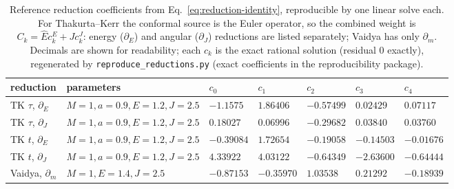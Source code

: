 \documentclass[
    aps, prd, twocolumn, superscriptaddress,
    showpacs, nofootinbib, floatfix
]{revtex4-2}
\newcommand{\Ehat}{\hat E}
\begin{document}
\begin{table}[t]
    \centering
    \caption{Reference reduction coefficients from
    Eq.~\eqref{eq:reduction-identity}, reproducible by one linear solve each. For
    Thakurta--Kerr the conformal source is the Euler operator, so the combined
    weight is $C_k=\Ehat c_k^{E}+J c_k^{J}$: energy ($\partial_E$) and angular
    ($\partial_J$) reductions are listed separately; Vaidya has only $\partial_m$.
    Decimals are shown for readability; each $c_k$ is the exact rational solution
    (residual $0$ exactly), regenerated by \texttt{reproduce\_reductions.py} (exact
    coefficients in the reproducibility package).}
    \label{tab:reduction-ck}
    \begin{ruledtabular}
    \begin{tabular}{lllllll}
        reduction & parameters & $c_0$ & $c_1$ & $c_2$ & $c_3$ & $c_4$\\
        \hline
        TK $\tau$, $\partial_E$ & $M{=}1,a{=}0.9,E{=}1.2,J{=}2.5$
            & $-1.1575$ & $1.86406$ & $-0.57499$ & $0.02429$ & $0.07117$\\
        TK $\tau$, $\partial_J$ & $M{=}1,a{=}0.9,E{=}1.2,J{=}2.5$
            & $0.18027$ & $0.06996$ & $-0.29682$ & $0.03840$ & $0.03760$\\
        TK $t$, $\partial_E$ & $M{=}1,a{=}0.9,E{=}1.2,J{=}2.5$
            & $-0.39084$ & $1.72654$ & $-0.19058$ & $-0.14503$ & $-0.01676$\\
        TK $t$, $\partial_J$ & $M{=}1,a{=}0.9,E{=}1.2,J{=}2.5$
            & $4.33922$ & $4.03122$ & $-0.64349$ & $-2.63600$ & $-0.64444$\\
        Vaidya, $\partial_m$ & $M{=}1,E{=}1.4,J{=}2.5$
            & $-0.87153$ & $-0.35970$ & $1.03538$ & $0.21292$ & $-0.18939$\\
    \end{tabular}
    \end{ruledtabular}
\end{table}
\end{document}
